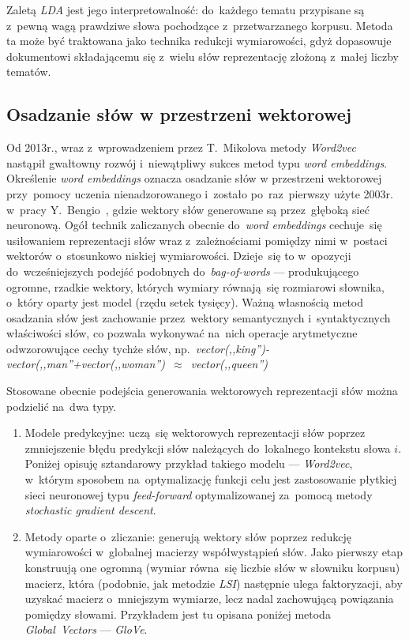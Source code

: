 \documentclass[pl]{minipw} %
\begin{document}
Zaletą \textit{LDA} jest jego interpretowalność: do~każdego tematu przypisane są z~pewną wagą prawdziwe słowa pochodzące z~przetwarzanego korpusu. Metoda ta może być traktowana jako technika redukcji wymiarowości, gdyż dopasowuje dokumentowi składającemu się z~wielu słów reprezentację złożoną z~małej liczby tematów.


\subsection{Osadzanie słów w przestrzeni wektorowej}
Od 2013r., wraz z~wprowadzeniem przez T.~Mikolova metody \textit{Word2vec}~\cite{word2vec} nastąpił gwałtowny rozwój i~niewątpliwy sukces metod typu \textit{word embeddings}. Określenie \textit{word embeddings} oznacza osadzanie słów w przestrzeni wektorowej przy~pomocy uczenia nienadzorowanego i~zostało po~raz~pierwszy użyte 2003r. w~pracy Y.~Bengio~\cite{bengio}, gdzie wektory słów generowane są przez~głęboką sieć neuronową. Ogół technik zaliczanych obecnie do~\textit{word embeddings} cechuje~się usiłowaniem reprezentacji słów wraz z~zależnościami pomiędzy nimi w~postaci wektorów o~stosunkowo niskiej wymiarowości. Dzieje~się to w~opozycji do~wcześniejszych podejść podobnych do~\textit{bag-of-words} --- produkującego ogromne, rzadkie wektory, których wymiary równają~się rozmiarowi słownika, o~który oparty jest model (rzędu setek tysięcy). Ważną własnością metod osadzania słów jest zachowanie przez~wektory semantycznych i~syntaktycznych właściwości słów, co pozwala wykonywać na~nich operacje arytmetyczne odwzorowujące cechy tychże słów, np.~\textit{vector(,,king'')-vector(,,man''+vector(,,woman'')~$\approx$~vector(,,queen'')} 

Stosowane obecnie podejścia generowania wektorowych reprezentacji słów można podzielić na~dwa typy.
\begin{enumerate}
	\item Modele predykcyjne: uczą~się wektorowych reprezentacji słów poprzez zmniejszenie błędu predykcji słów należących do~lokalnego kontekstu słowa $i$. Poniżej opisuję sztandarowy przykład takiego modelu --- \textit{Word2vec}, w~którym sposobem na~optymalizację funkcji celu jest zastosowanie płytkiej sieci neuronowej typu \textit{feed-forward} optymalizowanej za~pomocą metody \textit{stochastic gradient descent}.
	\item Metody oparte o~zliczanie: generują wektory słów poprzez redukcję wymiarowości w~globalnej macierzy współwystąpień słów.
	Jako pierwszy etap konstruują one ogromną (wymiar równa~się liczbie słów w słowniku korpusu) macierz, która (podobnie, jak  metodzie \textit{LSI}) następnie ulega faktoryzacji, aby uzyskać macierz o~mniejszym wymiarze, lecz nadal zachowującą powiązania pomiędzy słowami. Przykładem jest tu opisana poniżej metoda \textit{Global~Vectors} --- \textit{GloVe}.
\end{enumerate}
\end{document}
